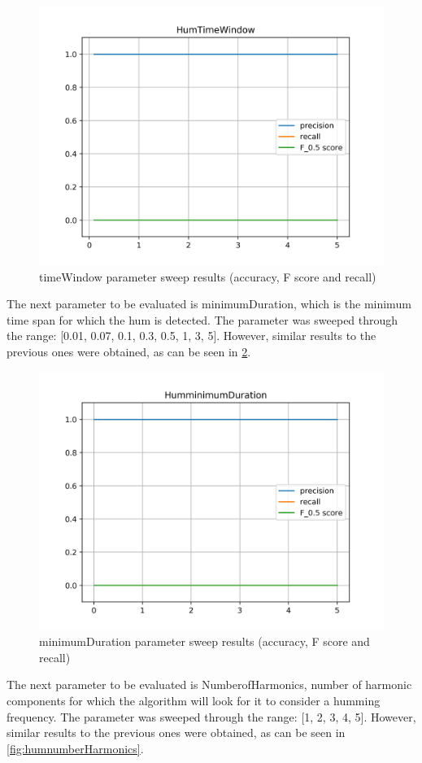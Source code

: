 \begin{figure}[H]
	\centering
	\includegraphics[clip, width=0.7\columnwidth]{Figures/HumTimeWindow.png}%
	\caption{timeWindow parameter sweep results (accuracy, F score and recall)}
	\label{fig:humTimeWindow}
\end{figure}

The next parameter to be evaluated is minimumDuration, which is the minimum time span for which the hum is detected. The parameter was sweeped through the range: [0.01, 0.07, 0.1, 0.3, 0.5, 1, 3, 5]. However, similar results to the previous ones were obtained, as can be seen in \ref{fig:humminimumDuration}.

\begin{figure}[H]
	\centering
	\includegraphics[clip,width=0.7\columnwidth]{Figures/HumminimumDuration.png}%
	\caption{minimumDuration parameter sweep results (accuracy, F score and recall)}
	\label{fig:humminimumDuration}
\end{figure}

The next parameter to be evaluated is NumberofHarmonics, number of harmonic components for which the algorithm will look for it to consider a humming frequency. The parameter was sweeped through the range: [1, 2, 3, 4, 5]. However, similar results to the previous ones were obtained, as can be seen in \ref{fig:humnumberHarmonics}.

